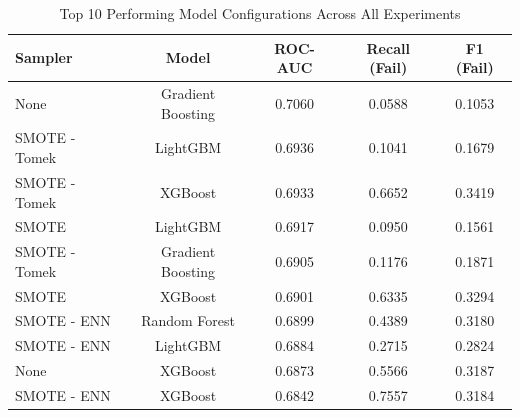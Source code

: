 \begin{table}[htbp]
\caption{Top 10 Performing Model Configurations Across All Experiments}
\label{tab:top_models}
\begin{tabular}{lcccc}
\toprule

Sampler & Model & ROC-AUC & Recall (Fail) & F1 (Fail) \\
\midrule

None & Gradient Boosting & 0.7060 & 0.0588 & 0.1053 \\
SMOTE - Tomek & LightGBM & 0.6936 & 0.1041 & 0.1679 \\
SMOTE - Tomek & XGBoost & 0.6933 & 0.6652 & 0.3419 \\
SMOTE & LightGBM & 0.6917 & 0.0950 & 0.1561 \\
SMOTE - Tomek & Gradient Boosting & 0.6905 & 0.1176 & 0.1871 \\
SMOTE & XGBoost & 0.6901 & 0.6335 & 0.3294 \\
SMOTE - ENN & Random Forest & 0.6899 & 0.4389 & 0.3180 \\
SMOTE - ENN & LightGBM & 0.6884 & 0.2715 & 0.2824 \\
None & XGBoost & 0.6873 & 0.5566 & 0.3187 \\
SMOTE - ENN & XGBoost & 0.6842 & 0.7557 & 0.3184 \\
\bottomrule

\end{tabular}
\end{table}

